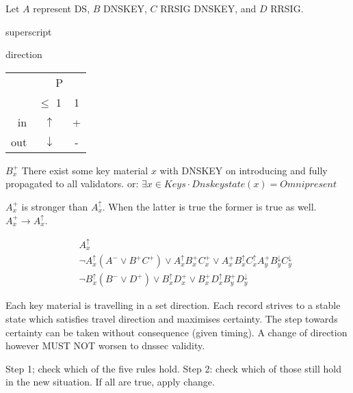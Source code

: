 \documentclass[a4paper]{article}
\begin{document}
Let $A$ represent DS, $B$ DNSKEY, $C$ RRSIG DNSKEY, and $D$ RRSIG.


superscript

direction
\begin{tabular}{ r | c  c }
	& \multicolumn{2}{c}{P} \\
   & $\leq$ 1 & 1 \\ \hline
  in & $\uparrow$ & + \\
  out & $\downarrow$ & - \\
\end{tabular}

$B_{x}^{+}$ There exist some key material $x$ with DNSKEY on introducing
and fully propagated to all validators. or: $\exists x \in Keys \cdot Dnskeystate(x) = Omnipresent$

$A_{x}^{+}$ is stronger than $A_{x}^{\uparrow}$. When the latter is true
the former is true as well.  $A_{x}^{+} \rightarrow A_{x}^{\uparrow}$.


\begin{eqnarray}
&& A_{x}^{\uparrow} \\
&& \neg A_{x}^{\uparrow} (A^{-} \vee B^{+} C^{+}) \vee A_{x}^{\uparrow}
	B_{x}^{+} C_{x}^{+} \vee A_{x}^{+} B_{x}^{\uparrow} C_{x}^{\uparrow}
	A_{y}^{+} B_{y}^{\downarrow} C_{y}^{\downarrow}\\
&& \neg B_{x}^{\uparrow} (B^{-} \vee D^{+}) \vee B_{x}^{\uparrow}
	D_{x}^{+} \vee B_{x}^{+} D_{x}^{\uparrow} B_{y}^{+}
	D_{y}^{\downarrow}
\end{eqnarray}

Each key material is travelling in a set direction. Each record strives to
a stable state which satisfies travel direction and maximises certainty. The
step towards certainty can be taken without consequence (given timing).
A change of direction however MUST NOT worsen to dnssec validity.

Step 1; check which of the five rules hold. Step 2: check which of those
still hold in the new situation. If all are true, apply change.
\end{document}

